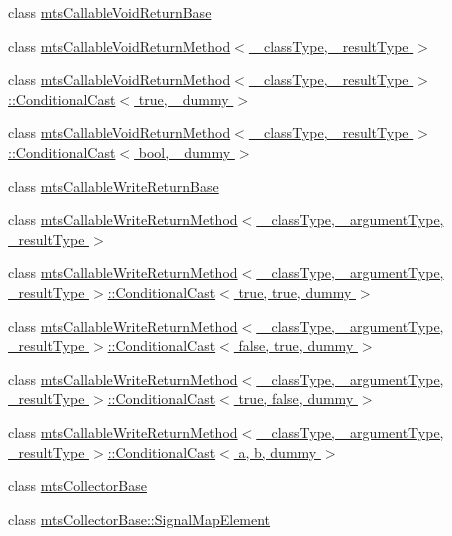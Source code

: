 \begin{DoxyCompactItemize}
class \hyperlink{classmts_callable_void_return_base}{mts\+Callable\+Void\+Return\+Base}
\item 
class \hyperlink{classmts_callable_void_return_method}{mts\+Callable\+Void\+Return\+Method$<$ \+\_\+class\+Type, \+\_\+result\+Type $>$}
\item 
class \hyperlink{classmts_callable_void_return_method_1_1_conditional_cast_3_01true_00_01__dummy_01_4}{mts\+Callable\+Void\+Return\+Method$<$ \+\_\+class\+Type, \+\_\+result\+Type $>$\+::\+Conditional\+Cast$<$ true, \+\_\+dummy $>$}
\item 
class \hyperlink{classmts_callable_void_return_method_1_1_conditional_cast}{mts\+Callable\+Void\+Return\+Method$<$ \+\_\+class\+Type, \+\_\+result\+Type $>$\+::\+Conditional\+Cast$<$ bool, \+\_\+dummy $>$}
\item 
class \hyperlink{classmts_callable_write_return_base}{mts\+Callable\+Write\+Return\+Base}
\item 
class \hyperlink{classmts_callable_write_return_method}{mts\+Callable\+Write\+Return\+Method$<$ \+\_\+class\+Type, \+\_\+argument\+Type, \+\_\+result\+Type $>$}
\item 
class \hyperlink{classmts_callable_write_return_method_1_1_conditional_cast_3_01true_00_01true_00_01dummy_01_4}{mts\+Callable\+Write\+Return\+Method$<$ \+\_\+class\+Type, \+\_\+argument\+Type, \+\_\+result\+Type $>$\+::\+Conditional\+Cast$<$ true, true, dummy $>$}
\item 
class \hyperlink{classmts_callable_write_return_method_1_1_conditional_cast_3_01false_00_01true_00_01dummy_01_4}{mts\+Callable\+Write\+Return\+Method$<$ \+\_\+class\+Type, \+\_\+argument\+Type, \+\_\+result\+Type $>$\+::\+Conditional\+Cast$<$ false, true, dummy $>$}
\item 
class \hyperlink{classmts_callable_write_return_method_1_1_conditional_cast_3_01true_00_01false_00_01dummy_01_4}{mts\+Callable\+Write\+Return\+Method$<$ \+\_\+class\+Type, \+\_\+argument\+Type, \+\_\+result\+Type $>$\+::\+Conditional\+Cast$<$ true, false, dummy $>$}
\item 
class \hyperlink{classmts_callable_write_return_method_1_1_conditional_cast}{mts\+Callable\+Write\+Return\+Method$<$ \+\_\+class\+Type, \+\_\+argument\+Type, \+\_\+result\+Type $>$\+::\+Conditional\+Cast$<$ a, b, dummy $>$}
\item 
class \hyperlink{classmts_collector_base}{mts\+Collector\+Base}
\item 
class \hyperlink{classmts_collector_base_1_1_signal_map_element}{mts\+Collector\+Base\+::\+Signal\+Map\+Element}

\end{DoxyCompactItemize}
